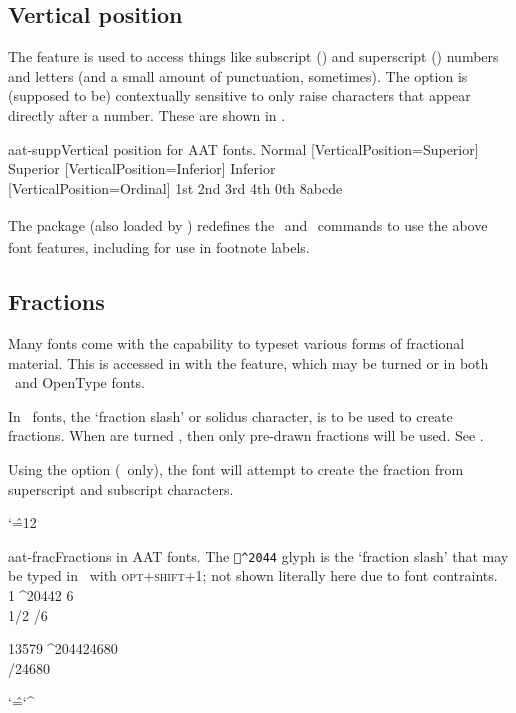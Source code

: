 \documentclass[a4paper]{l3doc}
\begin{document}
\subsection{Vertical position}
The  feature is used to access things like
subscript () and superscript () numbers and
letters (and a small amount of punctuation, sometimes).
The  option is (supposed to be)
contextually sensitive to only raise characters that appear directly
after a number.
These are shown in .

\begin{Xexample}{aat-supp}{Vertical position for AAT fonts.}
   Normal
  [VerticalPosition=Superior]
   Superior
  [VerticalPosition=Inferior]
   Inferior                \\
  [VerticalPosition=Ordinal]
   1st 2nd 3rd 4th 0th 8abcde
\end{Xexample}

The  package
(also loaded by )
redefines the \cmd\textsubscript\ and
\cmd\textsuperscript\ commands to use the above font features,
including for use in footnote labels.

\subsection{Fractions}
Many fonts come with the capability to typeset various forms of
fractional material. This is accessed in  with the
 feature, which may be turned  or 
in both \AAT\ and OpenType fonts.

In \AAT\ fonts, the `fraction slash' or solidus character, is
to be used to create fractions. When  are turned
, then only pre-drawn fractions will be used.
See .

Using the  option (\AAT\ only), the font will attempt
to create the fraction from superscript and subscript
characters.

\edef\caretcc{\the\catcode`\^}
\catcode`\^=12\relax
\begin{Xexample}{aat-frac}{Fractions in AAT fonts. The \texttt{\relax^^^^2044} glyph is the `fraction slash' that may be typed in \MacOSX\ with \textsc{opt+shift+1}; not shown literally here due to font contraints.}
   1{^^^^2044}2 6 \\ %
   1/2 /6    %

         13579{^^^^2044}24680 \\ %
   /24680    %
\end{Xexample}
\catcode`\^=\caretcc\relax
\end{document}
